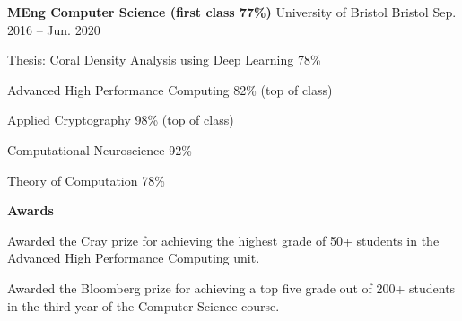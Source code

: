 \vspace{-1.1em}


\vspace{-0.2em}

\begin{cventries}

  \cventry
    {\textbf{MEng Computer Science (first class 77\%)}} %
    {University of Bristol} %
    {Bristol} %
    {Sep. 2016 -- Jun. 2020} %
    {
      \begin{cvitems} %
        \item {Thesis: Coral Density Analysis using Deep Learning 78\%}
        \item {Advanced High Performance Computing 82\% (top of class)}
        \item {Applied Cryptography 98\% (top of class)}
        \item {Computational Neuroscience 92\%}
        \item {Theory of Computation 78\%}
      \end{cvitems}
    }

    \cventry
    {\textbf{Awards}} %
    {} %
    {} %
    {} %
    {
      \begin{cvitems} %
        \item {Awarded the Cray prize for achieving the highest grade of 50+ students in the Advanced High Performance Computing unit.}
        \item {Awarded the Bloomberg prize for achieving a top five grade out of 200+ students in the third year of the Computer Science course.}
      \end{cvitems}
    }
    
\end{cventries}
